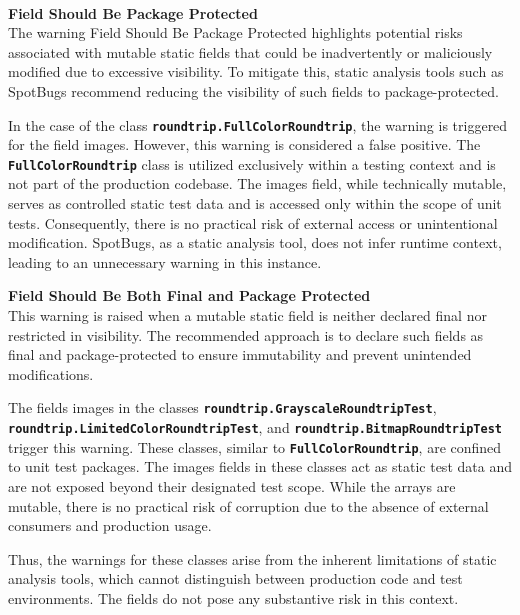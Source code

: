 \documentclass[sigconf]{acmart}
\begin{document}
\hfill\\
{{\textbf{Field Should Be Package Protected}}
\hfill\\

The warning Field Should Be Package Protected highlights potential risks associated with mutable static fields that could be inadvertently or maliciously modified due to excessive visibility. To mitigate this, static analysis tools such as SpotBugs recommend reducing the visibility of such fields to package-protected.

In the case of the class \textbf{\texttt{roundtrip.FullColorRoundtrip}}, the warning is triggered for the field images. However, this warning is considered a false positive. The \textbf{\texttt{FullColorRoundtrip}} class is utilized exclusively within a testing context and is not part of the production codebase. The images field, while technically mutable, serves as controlled static test data and is accessed only within the scope of unit tests. Consequently, there is no practical risk of external access or unintentional modification. SpotBugs, as a static analysis tool, does not infer runtime context, leading to an unnecessary warning in this instance.
\newpage

{\textbf{Field Should Be Both Final and Package Protected}}
\hfill\\

This warning is raised when a mutable static field is neither declared final nor restricted in visibility. The recommended approach is to declare such fields as final and package-protected to ensure immutability and prevent unintended modifications.

The fields images in the classes \textbf{\texttt{roundtrip.GrayscaleRound\allowbreak tripTest}}, \textbf{\texttt{roundtrip.LimitedColorRoundtripTest}}, and \textbf{\texttt{round\allowbreak trip.BitmapRoundtripTest}} trigger this warning. These classes, similar to \textbf{\texttt{FullColorRoundtrip}}, are confined to unit test packages. The images fields in these classes act as static test data and are not exposed beyond their designated test scope. While the arrays are mutable, there is no practical risk of corruption due to the absence of external consumers and production usage.

Thus, the warnings for these classes arise from the inherent limitations of static analysis tools, which cannot distinguish between production code and test environments. The fields do not pose any substantive risk in this context.

}
\end{document}
